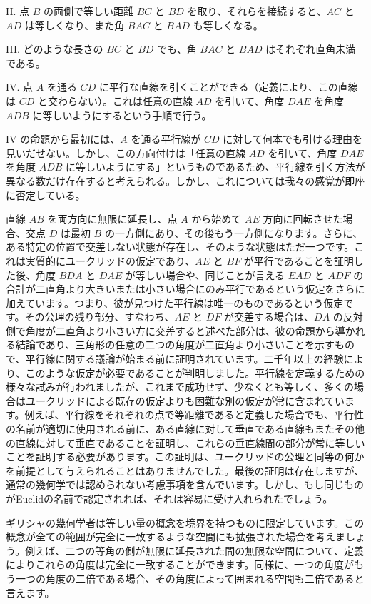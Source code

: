 \documentclass[a4paper,11pt,openany]{ltjsbook}
\begin{document}
II. 点 \( B \) の両側で等しい距離 \( BC \) と \( BD \) を取り、それらを接続すると、\( AC \) と \( AD \) は等しくなり、また角 \( BAC \) と \( BAD \) も等しくなる。

III. どのような長さの \( BC \) と \( BD \) でも、角 \( BAC \) と \( BAD \) はそれぞれ直角未満である。

IV. 点 \( A \) を通る \( CD \) に平行な直線を引くことができる（定義により、この直線は \( CD \) と交わらない）。これは任意の直線 \( AD \) を引いて、角度 \( DAE \) を角度 \( ADB \) に等しいようにするという手順で行う。

IV の命題から最初には、\( A \) を通る平行線が \( CD \) に対して何本でも引ける理由を見いだせない。しかし、この方向付けは「任意の直線 \( AD \) を引いて、角度 \( DAE \) を角度 \( ADB \) に等しいようにする」というものであるため、平行線を引く方法が異なる数だけ存在すると考えられる。しかし、これについては我々の感覚が即座に否定している。

直線 \( AB \) を両方向に無限に延長し、点 \( A \) から始めて \( AE \) 方向に回転させた場合、交点 \( D \) は最初 \( B \) の一方側にあり、その後もう一方側になります。さらに、ある特定の位置で交差しない状態が存在し、そのような状態はただ一つです。これは実質的にユークリッドの仮定であり、\( AE \) と \( BF \) が平行であることを証明した後、角度 \( BDA \) と \( DAE \) が等しい場合や、同じことが言える \( EAD \) と \( ADF \) の合計が二直角より大きいまたは小さい場合にのみ平行であるという仮定をさらに加えています。つまり、彼が見つけた平行線は唯一のものであるという仮定です。その公理の残り部分、すなわち、\( AE \) と \( DF \) が交差する場合は、\( DA \) の反対側で角度が二直角より小さい方に交差すると述べた部分は、彼の命題から導かれる結論であり、三角形の任意の二つの角度が二直角より小さいことを示すもので、平行線に関する議論が始まる前に証明されています。二千年以上の経験により、このような仮定が必要であることが判明しました。平行線を定義するための様々な試みが行われましたが、これまで成功せず、少なくとも等しく、多くの場合はユークリッドによる既存の仮定よりも困難な別の仮定が常に含まれています。例えば、平行線をそれぞれの点で等距離であると定義した場合でも、平行性の名前が適切に使用される前に、ある直線に対して垂直である直線もまたその他の直線に対して垂直であることを証明し、これらの垂直線間の部分が常に等しいことを証明する必要があります。この証明は、ユークリッドの公理と同等の何かを前提として与えられることはありませんでした。最後の証明は存在しますが、通常の幾何学では認められない考慮事項を含んでいます。しかし、もし同じものがEuclidの名前で認定されれば、それは容易に受け入れられたでしょう。

ギリシャの幾何学者は等しい量の概念を境界を持つものに限定しています。この概念が全ての範囲が完全に一致するような空間にも拡張された場合を考えましょう。例えば、二つの等角の側が無限に延長された間の無限な空間について、定義によりこれらの角度は完全に一致することができます。同様に、一つの角度がもう一つの角度の二倍である場合、その角度によって囲まれる空間も二倍であると言えます。
\end{document}
